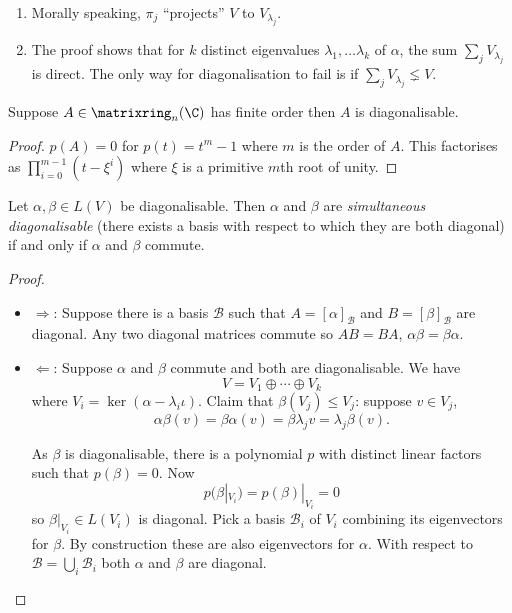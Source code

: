 \documentclass[a4paper]{article}
\newcommand*{\M}{\matrixring}
\newcommand*{\basis}{\mathcal}
\theoremstyle{definition}
\begin{document}
\begin{remark}\leavevmode
  \begin{enumerate}
  \item Morally speaking, \(\pi_j\) ``projects'' \(V\) to \(V_{\lambda_j}\).
  \item The proof shows that for \(k\) distinct eigenvalues \(\lambda_1, \dots \lambda_k\) of \(\alpha\), the sum \(\sum_j V_{\lambda_j}\) is direct. The only way for diagonalisation to fail is if \(\sum_j V_{\lambda_j} \lneq V\).
  \end{enumerate}
\end{remark}

\begin{corollary}
  Suppose \(A \in \M_n(\C)\) has finite order then \(A\) is diagonalisable. 
\end{corollary}

\begin{proof}
  \(p(A) = 0\) for \(p(t) = t^m - 1\) where \(m\) is the order of \(A\). This factorises as \(\prod_{i = 0}^{m - 1} (t - \xi^i)\) where \(\xi\) is a primitive \(m\)th root of unity.
\end{proof}

\begin{theorem}
  Let \(\alpha, \beta \in L(V)\) be diagonalisable. Then \(\alpha\) and \(\beta\) are \emph{simultaneous diagonalisable} (there exists a basis with respect to which they are both diagonal) if and only if \(\alpha\) and \(\beta\) commute.
\end{theorem}

\begin{proof}\leavevmode
  \begin{itemize}
  \item \(\Rightarrow\): Suppose there is a basis \(\basis B\) such that \(A = [\alpha]_{\basis B}\) and \(B = [\beta]_{\basis B}\) are diagonal. Any two diagonal matrices commute so \(AB = BA\), \(\alpha\beta = \beta\alpha\).
  \item \(\Leftarrow\): Suppose \(\alpha\) and \(\beta\) commute and both are diagonalisable. We have
    \[
      V = V_1 \oplus \cdots \oplus V_k
    \]
    where \(V_i = \ker(\alpha - \lambda_i\iota)\). Claim that \(\beta(V_j) \leq V_j\): suppose \(v \in V_j\),
    \[
      \alpha\beta (v) = \beta\alpha (v) = \beta\lambda_j v = \lambda_j \beta(v).
    \]

    As \(\beta\) is diagonalisable, there is a polynomial \(p\) with distinct linear factors such that \(p(\beta) = 0\). Now
    \[
      p(\beta|_{V_i}) = p(\beta)|_{V_i} = 0
    \]
    so \(\beta|_{V_i} \in L(V_i)\) is diagonal. Pick a basis \(\basis B_i\) of \(V_i\) combining its eigenvectors for \(\beta\). By construction these are also eigenvectors for \(\alpha\). With respect to \(\basis B = \bigcup_i \basis B_i\) both \(\alpha\) and \(\beta\) are diagonal.
  \end{itemize}
\end{proof}
\end{document}

